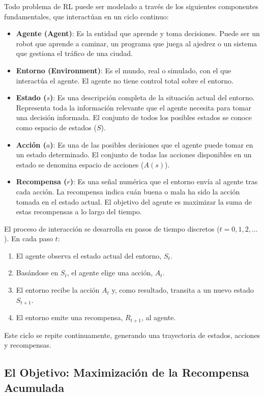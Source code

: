 \documentclass[12pt,a4paper]{book}
\begin{document}
Todo problema de RL puede ser modelado a través de los siguientes componentes fundamentales, que interactúan en un ciclo continuo:

\begin{itemize}
    \item \textbf{Agente (Agent)}: Es la entidad que aprende y toma decisiones. Puede ser un robot que aprende a caminar, un programa que juega al ajedrez o un sistema que gestiona el tráfico de una ciudad.
    \item \textbf{Entorno (Environment)}: Es el mundo, real o simulado, con el que interactúa el agente. El agente no tiene control total sobre el entorno.
    \item \textbf{Estado ($s$)}: Es una descripción completa de la situación actual del entorno. Representa toda la información relevante que el agente necesita para tomar una decisión informada. El conjunto de todos los posibles estados se conoce como espacio de estados ($S$).
    \item \textbf{Acción ($a$)}: Es una de las posibles decisiones que el agente puede tomar en un estado determinado. El conjunto de todas las acciones disponibles en un estado se denomina espacio de acciones ($A(s)$).
    \item \textbf{Recompensa ($r$)}: Es una señal numérica que el entorno envía al agente tras cada acción. La recompensa indica cuán buena o mala ha sido la acción tomada en el estado actual. El objetivo del agente es maximizar la suma de estas recompensas a lo largo del tiempo.
\end{itemize}

El proceso de interacción se desarrolla en pasos de tiempo discretos ($t=0, 1, 2, ...$). En cada paso $t$:
\begin{enumerate}
    \item El agente observa el estado actual del entorno, $S_t$.
    \item Basándose en $S_t$, el agente elige una acción, $A_t$.
    \item El entorno recibe la acción $A_t$ y, como resultado, transita a un nuevo estado $S_{t+1}$.
    \item El entorno emite una recompensa, $R_{t+1}$, al agente.
\end{enumerate}
Este ciclo se repite continuamente, generando una trayectoria de estados, acciones y recompensas.

\subsection{El Objetivo: Maximización de la Recompensa Acumulada}
\end{document}
